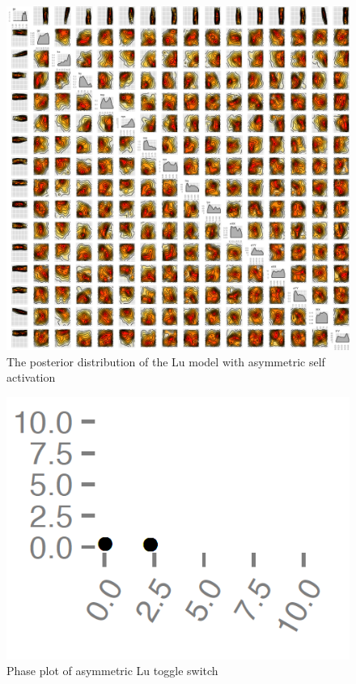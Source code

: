 \begin{figure}[t]
\centering
\includegraphics[scale=0.35]{chapterModelling/Lu_switches/images/single_pos/posterior_lu_sp_bis.png}
\caption[The posterior distribution of the Lu model with asymmetric self activation]{The posterior distribution of the Lu model with asymmetric self activation}
\label{fig:lu_sp_pos}
\end{figure}

\begin{figure}[t]
\centering
\includegraphics[scale=0.2]{chapterModelling/Lu_switches/images/single_pos/phase_plot.png}
\caption{Phase plot of asymmetric Lu toggle switch}
\label{fig:lu_sp_phase}
\end{figure}
\clearpage

